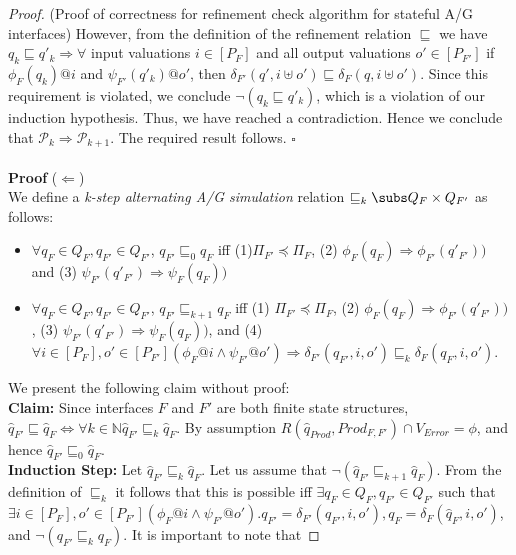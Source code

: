 \begin{proof}{(Proof of correctness for refinement check algorithm for 
stateful A/G interfaces)}
However, from the definition of the refinement relation $\sqsubseteq$ we
have $q_k \sqsubseteq q'_k \Rightarrow \forall$ input valuations 
$i \in [P_F]$ and all output valuations $o' \in [P_{F'}]$ if 
$\phi_F(q_k) @ i$ and $\psi_{F'}(q'_k) @ o'$, then 
$\delta_{F'}(q',i \uplus o') \sqsubseteq \delta_F(q,i \uplus o')$.
Since this requirement is violated, we conclude $\lnot (q_k \sqsubseteq 
q'_k)$, which is a violation of our induction hypothesis.
Thus, we have reached a contradiction.
Hence we conclude that $\mathcal{P}_k \Rightarrow \mathcal{P}_{k+1}$.
The required result follows. $\square$ \\ \\
{\bf Proof} ($\Leftarrow$) \\
We define a {\em k-step alternating A/G simulation} relation 
$\sqsubseteq_k \subs Q_F \times Q_{F'}$ as follows: \\
\begin{itemize}
\item $\forall q_F \in Q_F, q_{F'} \in Q_{F'}$, $q_{F'} \sqsubseteq_0 q_F$
iff (1)$\Pi_{F'} \preceq \Pi_F$, (2) $\phi_F(q_F) \Rightarrow 
\phi_{F'}(q'_{F'}))$ and (3) $\psi_{F'}(q'_{F'}) \Rightarrow \psi_F(q_F))$
\item $\forall q_F \in Q_F, q_{F'} \in Q_{F'}$, $q_{F'} \sqsubseteq_{k+1}
q_F$ iff (1) $\Pi_{F'} \preceq \Pi_F$, (2) $\phi_F(q_F) \Rightarrow 
\phi_{F'}(q'_{F'}))$, (3) $\psi_{F'}(q'_{F'}) \Rightarrow \psi_F(q_F))$,
and (4) $\forall i \in [P_F], o' \in [P_{F'}] (\phi_F @ i \land 
\psi_{F'} @ o') \Rightarrow \delta_{F'}(q_{F'},i,o') \sqsubseteq_k 
\delta_F(q_F,i,o')$.
\end{itemize}
We present the following claim without proof: \\
{\bf Claim:} Since interfaces $F$ and $F'$ are both finite state structures,
$\hat{q}_{F'} \sqsubseteq \hat{q}_F \iff \forall k \in \mathbb{N} 
\hat{q}_{F'} \sqsubseteq_k \hat{q}_F$.
By assumption $R(\hat{q}_{Prod},Prod_{F,F'}) \cap V_{Error} = \phi$, and hence
$\hat{q}_{F'} \sqsubseteq_0 \hat{q}_F$. \\
{\bf Induction Step:} Let $\hat{q}_{F'} \sqsubseteq_k \hat{q}_F$. 
Let us assume that $\lnot (\hat{q}_{F'} \sqsubseteq_{k+1} \hat{q}_F)$.
From the definition of $\sqsubseteq_k$ it follows that this is possible
iff $\exists q_F \in Q_F, q_{F'} \in Q_{F'}$ such that $\exists i \in 
[P_F], o' \in [P_{F'}] (\phi_F @ i \land \psi_{F'} @ o'). q_{F'} = 
\delta_{F'}(\hat{q}_{F'},i,o'), q_F = \delta_F(\hat{q}_F,i,o')$, and
$\lnot ( q_{F'} \sqsubseteq_k q_F)$. It is important to note that 

\end{proof}
